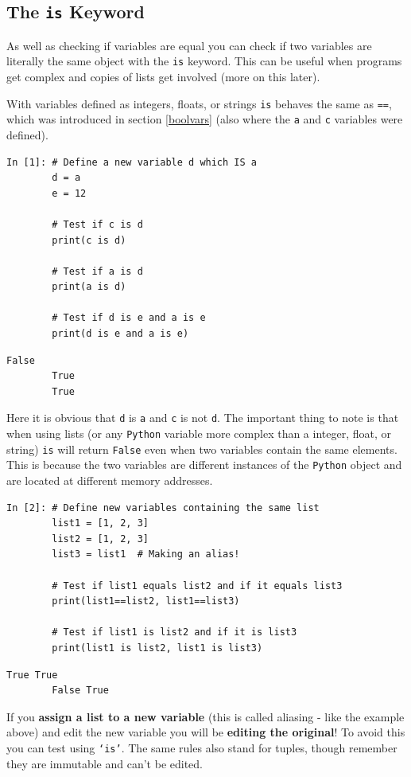 \begin{tcolorbox}[colback=red!5!white,colframe=red!75!black]
\subsection{The \texttt{is} Keyword}
As well as checking if variables are equal you can check if two variables are literally the same object with the \texttt{is} keyword. This can be useful when programs get complex and copies of lists get involved (more on this later). 

With variables defined as integers, floats, or strings \texttt{is} behaves the same as \texttt{==}, which was introduced in section \ref{boolvars} (also where the \texttt{a} and \texttt{c} variables were defined).
\begin{lstlisting}[style=PY]
In [1]: # Define a new variable d which IS a
        d = a
        e = 12
        
        # Test if c is d
        print(c is d)
        
        # Test if a is d
        print(a is d)
        
        # Test if d is e and a is e
        print(d is e and a is e)
\end{lstlisting}
\begin{lstlisting}[style=PY_out]
        False
        True
        True
\end{lstlisting}
Here it is obvious that \texttt{d} is \texttt{a} and \texttt{c} is not \texttt{d}. The important thing to note is that when using lists (or any \texttt{Python} variable more complex than a integer, float, or string) \texttt{is} will return \texttt{False} even when two variables contain the same elements. This is because the two variables are different instances of the \texttt{Python} object and are located at different memory addresses.

\begin{lstlisting}[style=PY]
In [2]: # Define new variables containing the same list
        list1 = [1, 2, 3]
        list2 = [1, 2, 3]
        list3 = list1  # Making an alias!
        
        # Test if list1 equals list2 and if it equals list3
        print(list1==list2, list1==list3)
        
        # Test if list1 is list2 and if it is list3
        print(list1 is list2, list1 is list3)
\end{lstlisting}
\begin{lstlisting}[style=PY_out]
        True True
        False True
\end{lstlisting}
If you \textbf{assign a list to a new variable} (this is called aliasing - like the example above) and edit the new variable you will be \textbf{editing the original}! To avoid this you can test using \texttt{`is'}. The same rules also stand for tuples, though remember they are immutable and can't be edited.
\end{tcolorbox}
